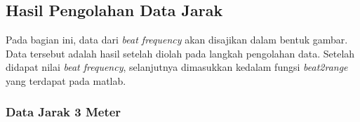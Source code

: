 \chapter{\babLima}

\section{Hasil Pengolahan Data Jarak}
Pada bagian ini, data dari \textit{beat frequency} akan disajikan dalam bentuk gambar. Data tersebut adalah hasil setelah diolah pada langkah pengolahan data. Setelah didapat nilai \textit{beat frequency}, selanjutnya dimasukkan kedalam fungsi \textit{beat2range} yang terdapat pada matlab.

\subsection{Data Jarak 3 Meter}

